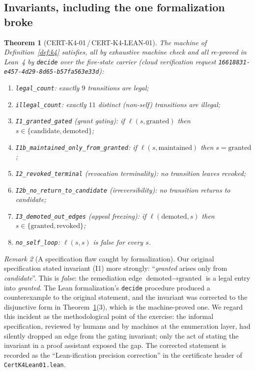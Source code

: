 \documentclass[11pt]{article}
\newtheorem{theorem}{Theorem}[section]
\theoremstyle{definition}
\theoremstyle{remark}
\newtheorem{remark}[theorem]{Remark}
\newcommand{\rid}[1]{\texttt{#1}}
\newcommand{\lean}[1]{\texttt{#1}}
\begin{document}
\subsection{Invariants, including the one formalization broke}

\begin{theorem}[CERT-K4-01\,/\,CERT-K4-LEAN-01]\label{thm:k4}
The machine of Definition~\ref{def:k4} satisfies, all by exhaustive machine
check and all re-proved in Lean~4 by \texttt{decide} over the five-state
carrier (cloud verification request
\rid{16618831-e457-4d29-8d65-b57fa563e33d}):
\begin{enumerate}
\item \lean{legal\_count}: exactly $9$ transitions are legal;
\item \lean{illegal\_count}: exactly $11$ distinct (non-self) transitions are
illegal;
\item \lean{I1\_granted\_gated} (grant gating): if $\ell(s,\text{granted})$
then $s\in\{\text{candidate},\text{demoted}\}$;
\item \lean{I1b\_maintained\_only\_from\_granted}: if
$\ell(s,\text{maintained})$ then $s=\text{granted}$;
\item \lean{I2\_revoked\_terminal} (revocation terminality): no transition
leaves \emph{revoked};
\item \lean{I2b\_no\_return\_to\_candidate} (irreversibility): no transition
returns to \emph{candidate};
\item \lean{I3\_demoted\_out\_edges} (appeal freezing): if
$\ell(\text{demoted},s)$ then $s\in\{\text{granted},\text{revoked}\}$;
\item \lean{no\_self\_loop}: $\ell(s,s)$ is false for every $s$.
\end{enumerate}
\end{theorem}

\begin{remark}[A specification flaw caught by formalization]\label{rem:i1}
Our original specification stated invariant (I1) more strongly: ``\emph{granted}
arises only from \emph{candidate}''. This is \emph{false}: the
remediation edge $\text{demoted}\to\text{granted}$ is a legal entry into
\emph{granted}. The Lean formalization's \texttt{decide} procedure produced a
counterexample to the original statement, and the invariant was corrected to
the disjunctive form in Theorem~\ref{thm:k4}(3), which is the machine-proved
one. We regard this incident as the methodological point of the exercise:
the informal specification, reviewed by humans and by machines at the
enumeration layer, had silently dropped an edge from the gating invariant;
only the act of stating the invariant in a proof assistant exposed the gap.
The corrected statement is recorded as the ``Lean-ification precision
correction'' in the certificate header of
\lean{CertK4Lean01.lean}.
\end{remark}
\end{document}
